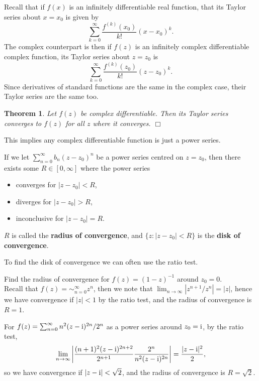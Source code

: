 \documentclass[letter-paper]{tufte-book}
\newtheorem{theorem}{\color{pastel-blue}Theorem}[section]
\newenvironment{example}[1][Example]{\begin{trivlist}
\item[\hskip \labelsep {\bfseries #1}]}{\end{trivlist}}
\newcommand{\zi}{{\rm i}}
\newcommand\Def[1]{\textbf{#1}}
\newcommand{\qedwhite}{\hfill \ensuremath{\Box}}
\begin{document}
Recall that if $f(x)$ is an infinitely differentiable real function, that its
Taylor series about $x = x_0$ is given by
\begin{equation*}
  \sum^\infty_{k=0} \frac{f^{(k)}(x_0)}{k!}(x - x_0)^k.
\end{equation*}
The complex counterpart is then if $f(z)$ is an infinitely complex
differentiable complex function, its Taylor series about $z = z_0$ is
\begin{equation*}
  \sum^\infty_{k=0} \frac{f^{(k)}(z_0)}{k!}(z - z_0)^k.
\end{equation*}
Since derivatives of standard functions are the same in the complex case, their
Taylor series are the same too.

\begin{theorem}
  Let $f(z)$ be complex differentiable. Then its Taylor series converges to
  $f(z)$ for all $z$ where it converges. \qedwhite
\end{theorem}
This implies any complex differentiable function is just a power series.

If we let $\sum^\infty_{n=0} b_n (z - z_0)^n$ be a power series centred on $z =
z_0$, then there exists some $R \in [0, \infty]$ where the power series
\begin{itemize}
  \item converges for $|z - z_0| < R$,
  \item diverges for $|z - z_0| > R$,
  \item inconclusive for $|z - z_0| = R$.
\end{itemize}
$R$ is called the \Def{radius of convergence}, and $\{z : |z - z_0| < R\}$ is
the \Def{disk of convergence}.

To find the disk of convergence we can often use the ratio test.

\begin{example}
  Find the radius of convergence for $f(z) = (1 - z)^{-1}$ around $z_0 = 0$.\\
  
  Recall that $f(z) = \sim^\infty_{n=0} z^n$, then we note that $\lim_{n \to
  \infty} |z^{n+1} / z^n| = |z|$, hence we have convergence if $|z| < 1$ by the
  ratio test, and the radius of convergence is $R = 1$.
\end{example}

\begin{example}
  For $f(z) = \sum^\infty_{n=0} n^2 (z - \zi)^{2n} / 2^n$ as a power series around
  $z_0 = \zi$, by the ratio test,
  \begin{equation*}
    \lim_{n \to \infty} \left|\frac{(n+1)^2 (z - \zi)^{2n+2}}{2^{n+1}}\frac{2^n}{n^2 (z-\zi)^{2n}}\right| = \frac{|z - \zi|^2}{2},
  \end{equation*}
  so we have convergence if $|z - \zi| < \sqrt{2}$, and the radius of
  convergence is $R = \sqrt{2}$.
\end{example}
\end{document}
